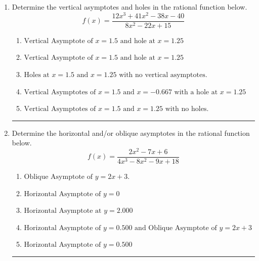 \documentclass[14pt]{extbook}
\newcommand{\litem}[1]{\item#1\hspace*{-1cm}\rule{\textwidth}{0.4pt}}
\begin{document}
\begin{enumerate}
{\begin{enumerate}[label=\Alph*.]
\end{enumerate} }
\litem{
Determine the vertical asymptotes and holes in the rational function below.\[ f(x) = \frac{12x^{3} +41 x^{2} -38 x -40}{8x^{2} -22 x + 15} \]\begin{enumerate}[label=\Alph*.]
\item \( \text{Vertical Asymptote of } x = 1.5 \text{ and hole at } x = 1.25 \)
\item \( \text{Vertical Asymptote of } x = 1.5 \text{ and hole at } x = 1.25 \)
\item \( \text{Holes at } x = 1.5 \text{ and } x = 1.25 \text{ with no vertical asymptotes.} \)
\item \( \text{Vertical Asymptotes of } x = 1.5 \text{ and } x = -0.667 \text{ with a hole at } x = 1.25 \)
\item \( \text{Vertical Asymptotes of } x = 1.5 \text{ and } x = 1.25 \text{ with no holes.} \)

\end{enumerate} }
\litem{
Determine the horizontal and/or oblique asymptotes in the rational function below.\[ f(x) = \frac{2x^{2} -7 x + 6}{4x^{3} -8 x^{2} -9 x + 18} \]\begin{enumerate}[label=\Alph*.]
\item \( \text{Oblique Asymptote of } y = 2x + 3. \)
\item \( \text{Horizontal Asymptote of } y = 0 \)
\item \( \text{Horizontal Asymptote at } y = 2.000 \)
\item \( \text{Horizontal Asymptote of } y = 0.500 \text{ and Oblique Asymptote of } y = 2x + 3 \)
\item \( \text{Horizontal Asymptote of } y = 0.500  \)

\end{enumerate} }
\end{enumerate}
\end{document}
